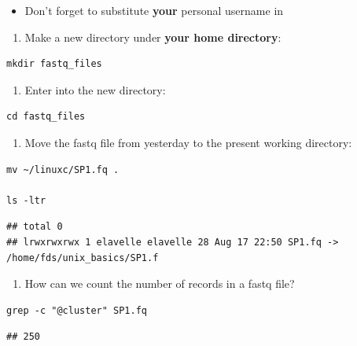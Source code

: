 \documentclass[
]{book}
\providecommand{\tightlist}{%
  \setlength{\itemsep}{0pt}\setlength{\parskip}{0pt}}
\begin{document}
\begin{itemize}
\tightlist
\item
  Don't forget to substitute \textbf{your} personal username in
\end{itemize}

\begin{enumerate}
\def\labelenumi{\arabic{enumi})}
\setcounter{enumi}{2}
\tightlist
\item
  Make a new directory under \textbf{your home directory}:
\end{enumerate}

\begin{verbatim}
mkdir fastq_files
\end{verbatim}

\begin{enumerate}
\def\labelenumi{\arabic{enumi})}
\setcounter{enumi}{3}
\tightlist
\item
  Enter into the new directory:
\end{enumerate}

\begin{verbatim}
cd fastq_files
\end{verbatim}

\begin{enumerate}
\def\labelenumi{\arabic{enumi})}
\setcounter{enumi}{4}
\tightlist
\item
  Move the fastq file from yesterday to the present working directory:
\end{enumerate}

\begin{verbatim}
mv ~/linuxc/SP1.fq .

ls -ltr
\end{verbatim}

\begin{verbatim}
## total 0
## lrwxrwxrwx 1 elavelle elavelle 28 Aug 17 22:50 SP1.fq -> /home/fds/unix_basics/SP1.f
\end{verbatim}

\begin{enumerate}
\def\labelenumi{\arabic{enumi})}
\setcounter{enumi}{5}
\tightlist
\item
  How can we count the number of records in a fastq file?
\end{enumerate}

\begin{verbatim}
grep -c "@cluster" SP1.fq
\end{verbatim}

\begin{verbatim}
## 250
\end{verbatim}
\end{document}
